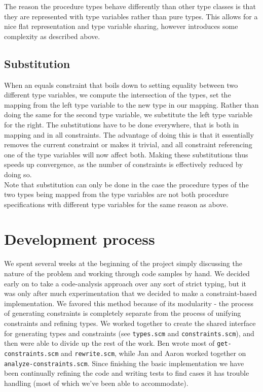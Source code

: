 \documentclass[a4paper]{article}
\begin{document}
The reason the procedure types behave differently than other type classes is that
they are represented with type variables rather than pure types.
This allows for a nice flat representation and type variable sharing,
however introduces some complexity as described above.

\subsection{Substitution}

When an equals constraint that boils down to setting equality between two different
type variables, we compute the intersection of the types, set the mapping from the
left type variable to the new type in our mapping.
Rather than doing the same for the second type variable, we substitute the left type
variable for the right.
The substitutions have to be done everywhere, that is both in mapping and in all constraints.
The advantage of doing this is that it essentially removes the current constraint
or makes it trivial, and all constraint referencing one of the type variables will
now affect both.
Making these substitutions thus speeds up convergence, as the number of constraints
is effectively reduced by doing so.\\

Note that substitution can only be done in the case the procedure types
of the two types being mapped from the type variables are not both procedure specifications
with different type variables for the same reason as above.

\section{Development process}

We spent several weeks at the beginning of the project simply discussing the 
nature of the problem and working through code samples by hand.  We decided 
early on to take a code-analysis approach over any sort of strict typing, but 
it was only after much experimentation that we decided to make a 
constraint-based implementation.  We favored this method because of its 
modularity - the process of generating constraints is completely separate from 
the process of unifying constraints and refining types.  We worked together to 
create the shared interface for generating types and constraints
(see {\tt types.scm} and {\tt constraints.scm}), and then were able to divide 
up the rest of the work.  Ben wrote most of {\tt get-constraints.scm} and 
{\tt rewrite.scm}, while Jan and Aaron worked together on
{\tt analyze-constraints.scm}.  Since finishing the basic implementation we 
have been continually refining the code and writing tests to find cases it has 
trouble handling (most of which we've been able to accommodate).
\end{document}
